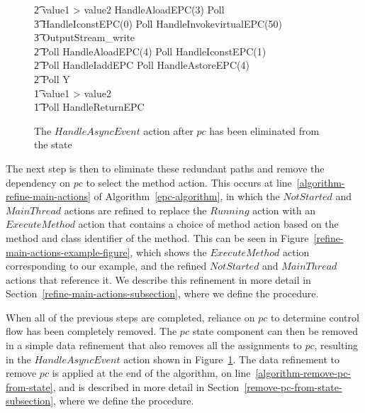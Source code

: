 \begin{figure}
\begin{circus}
    \t2 {} \circelse value1 > value2 \circthen HandleAloadEPC(3) \circseq Poll \circseq \\
    \t3 HandleIconstEPC(0) \circseq Poll \circseq HandleInvokevirtualEPC(50) \circseq \\
    \t3 OutputStream\_write \\
    \t2 \circfi \circseq Poll \circseq HandleAloadEPC(4) \circseq Poll \circseq HandleIconstEPC(1) \circseq \\
    \t2 Poll \circseq HandleIaddEPC \circseq Poll \circseq HandleAstoreEPC(4) \circseq \\
    \t2 Poll \circseq Y \\
    \t1 {} \circelse value1 > value2 \circthen \Skip \\
    \t1 \circfi \circseq Poll \circseq HandleReturnEPC
  \end{circus}
  \caption{The $HandleAsyncEvent$ action after $pc$ has been eliminated from the state}
  \label{pc-elimination-HandleAsyncEvent-example-figure}
\end{figure}

The next step is then to eliminate these redundant paths and remove
the dependency on $pc$ to select the method action.
This occurs at line~\ref{algorithm-refine-main-actions} of
Algorithm~\ref{epc-algorithm}, in which the $NotStarted$ and
$MainThread$ actions are refined to replace the $Running$ action with
an $ExecuteMethod$ action that contains a choice of method action
based on the method and class identifier of the method.
This can be seen in Figure~\ref{refine-main-actions-example-figure},
which shows the $ExecuteMethod$ action corresponding to our example,
and the refined $NotStarted$ and $MainThread$ actions that reference
it.
We describe this refinement in more detail in
Section~\ref{refine-main-actions-subsection}, where we define the
 procedure.

When all of the previous steps are completed, reliance on $pc$ to
determine control flow has been completely removed.
The $pc$ state component can then be removed in a simple data
refinement that also removes all the assignments to $pc$, resulting in
the $HandleAsyncEvent$ action shown in
Figure~\ref{pc-elimination-HandleAsyncEvent-example-figure}.
The data refinement to remove $pc$ is applied at the end of the
algorithm, on line~\ref{algorithm-remove-pc-from-state}, and is
described in more detail in
Section~\ref{remove-pc-from-state-subsection}, where we define the
 procedure.

